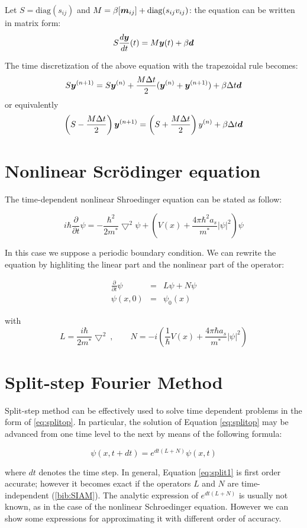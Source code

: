 \documentclass[a4paper,11pt]{article}
\newcommand{\ve}[1]{\mbox{\boldmath $ #1$}}
\begin{document}
Let $S = \mbox{diag}(s_{ij})$ and $M = \beta [\ve m_{ij}] + \mbox{diag}(s_{ij}v_{ij})$: the equation can be written in matrix form:
$$ S \frac{d \ve y}{dt}(t) = M \ve y(t) + \beta \ve d$$

The time discretization of the above equation with the trapezoidal rule becomes:
$$ S \ve y^{(n+1)} = S \ve y^{(n)} + \frac{M \Delta t}{2} (\ve y^{(n)} + \ve y^{(n+1)}) + \beta \Delta t \ve d$$
or equivalently
$$ \left( S - \frac{M \Delta t}{2} \right) \ve y^{(n+1)} = \left( S + \frac{M \Delta t}{2} \right) y^{(n)} + \beta \Delta t \ve d $$

\section{Nonlinear Scr\"{o}dinger equation}
The time-dependent nonlinear Shroedinger equation can be stated as follow:

$$ i \hbar \frac{\partial}{\partial t} \psi =
   -\frac{\hbar^2}{2m^*} \bigtriangledown^2 \psi +
   \left(V(x) + \frac{4 \pi \hbar^2 a_s}{m^*} |\psi|^2 \right) \psi $$

In this case we suppose a periodic boundary condition. We can rewrite the equation by highliting the linear part and the nonlinear part of the operator:

\begin{eqnarray}
\frac{\partial}{\partial t} \psi & = & L \psi + N \psi \label{eq:splitop} \\
\psi(x, 0) & = & \psi_0(x)
\end{eqnarray}

with
$$ L = \frac{i\hbar}{2m^*} \bigtriangledown^2 \ , \qquad
   N = -i \left(\frac{1}{\hbar}V(x) + \frac{4 \pi \hbar a_s}{m^*} |\psi|^2 \right) $$

\section{Split-step Fourier Method}
Split-step method can be effectively used to solve time dependent problems in the form of \ref{eq:splitop}.
In particular, the solution of Equation \ref{eq:splitop} may be advanced from one time level to the next by means of the following formula:

$$ \psi(x, t+dt) = e^{dt(L+N)} \psi(x, t) \label{eq:split1} $$

where $dt$ denotes the time step. In general, Equation \ref{eq:split1} is first order accurate; however it becomes exact if the operators $L$ and $N$ are time-independent (\ref{bib:SIAM}).
The analytic expression of $e^{dt(L+N)}$ is usually not known, as in the case of the nonlinear Schroedinger equation. However we can show some expressions for approximating it with different order of accuracy.
\end{document}
